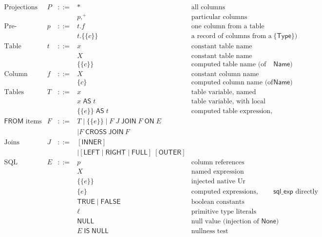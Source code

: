 \documentclass{article}
\newcommand{\mt}[1]{\mathsf{#1}}
\begin{document}
$$\begin{array}{rrcll}
  \textrm{Projections} & P &::=& \ast & \textrm{all columns} \\
  &&& p,^+ & \textrm{particular columns} \\
  \textrm{Pre-projections} & p &::=& t.f & \textrm{one column from a table} \\
  &&& t.\{\{c\}\} & \textrm{a record of columns from a table (of kind $\{\mt{Type}\}$)} \\
  \textrm{Table names} & t &::=& x & \textrm{constant table name (automatically capitalized)} \\
  &&& X & \textrm{constant table name} \\
  &&& \{\{c\}\} & \textrm{computed table name (of kind $\mt{Name}$)} \\
  \textrm{Column names} & f &::=& X & \textrm{constant column name} \\
  &&& \{c\} & \textrm{computed column name (of kind $\mt{Name}$)} \\
  \textrm{Tables} & T &::=& x & \textrm{table variable, named locally by its own capitalization} \\
  &&& x \; \mt{AS} \; t & \textrm{table variable, with local name} \\
  &&& \{\{e\}\} \; \mt{AS} \; t & \textrm{computed table expression, with local name} \\
  \textrm{$\mt{FROM}$ items} & F &::=& T \mid \{\{e\}\} \mid F \; J \; \mt{JOIN} \; F \; \mt{ON} \; E \\
  &&& \mid F \; \mt{CROSS} \; \mt{JOIN} \ F \\
  \textrm{Joins} & J &::=& [\mt{INNER}] \\
  &&& \mid [\mt{LEFT} \mid \mt{RIGHT} \mid \mt{FULL}] \; [\mt{OUTER}] \\
  \textrm{SQL expressions} & E &::=& p & \textrm{column references} \\
  &&& X & \textrm{named expression references} \\
  &&& \{\{e\}\} & \textrm{injected native Ur expressions} \\
  &&& \{e\} & \textrm{computed expressions, probably using $\mt{sql\_exp}$ directly} \\
  &&& \mt{TRUE} \mid \mt{FALSE} & \textrm{boolean constants} \\
  &&& \ell & \textrm{primitive type literals} \\
  &&& \mt{NULL} & \textrm{null value (injection of $\mt{None}$)} \\
  &&& E \; \mt{IS} \; \mt{NULL} & \textrm{nullness test} \\

\end{array}$$
\end{document}
